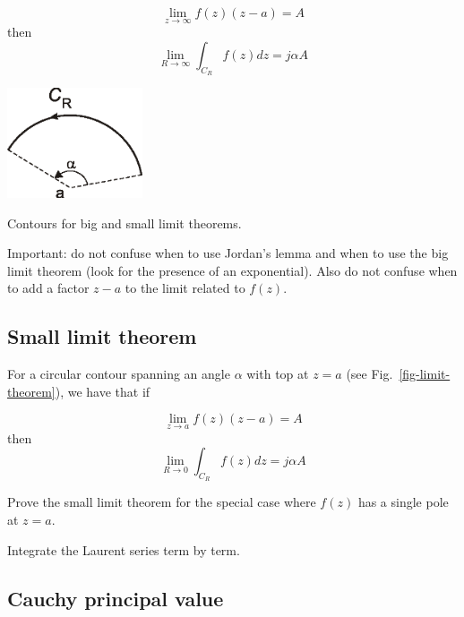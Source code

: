 \begin{equation}
\lim_{z \to \infty}  f(z) (z-a) = A
\end{equation}
then
\begin{equation}
\lim_{R \to \infty} \int_{{C}_R} f(z) dz = j \alpha A
\end{equation}

\begin{marginfigure}
\centering
\includegraphics[width=4cm]{complex/figures/limit_theorem}
\caption{Contours for big and small limit theorems.}
\label{fig-limit-theorem}
\end{marginfigure}

Important: do not confuse when to use Jordan's lemma and when to use the big limit theorem (look for the presence of an exponential). Also do not confuse when to add a factor $z-a$ to the limit related to $f(z)$.

\subsection*{Small limit theorem} 

For a circular contour spanning an angle $\alpha$ with top at $z=a$ (see Fig.~\ref{fig-limit-theorem}), we have that if

\begin{equation}
\lim_{z \to a}  f(z) (z-a) = A
\end{equation}
then
\begin{equation}
\lim_{R \to 0} \int_{{C}_R} f(z) dz = j \alpha A
\end{equation}

\begin{exer}
  Prove the small limit theorem for the special case where $f(z)$ has a single pole at $z=a$.
  \begin{hnt}
    Integrate the Laurent series term by term.
  \end{hnt}
\end{exer}

\subsection*{Cauchy principal value}

